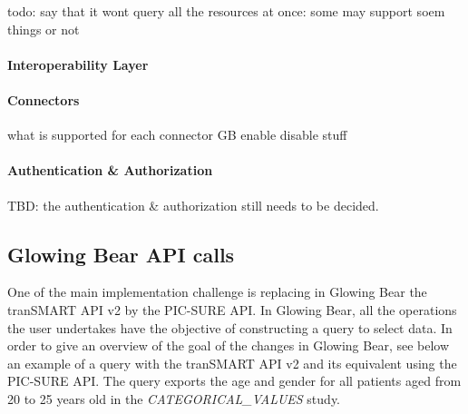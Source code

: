todo: say that it wont query all the resources at once: some may support soem things or not 



\paragraph{Interoperability Layer}

\paragraph{Connectors}
what is supported for each connector
GB enable disable stuff

\paragraph{Authentication \& Authorization}
TBD: the authentication \& authorization still needs to be decided.


\subsection{Glowing Bear API calls}

One of the main implementation challenge is replacing in Glowing Bear the tranSMART API v2 by the PIC-SURE API.
In Glowing Bear, all the operations the user undertakes have the objective of constructing a query to select data.
In order to give an overview of the goal of the changes in Glowing Bear, see below an example of a query with the tranSMART API v2 and its equivalent using the PIC-SURE API.
The query exports the age and gender for all patients aged from 20 to 25 years old in the \emph{CATEGORICAL\_VALUES} study.


